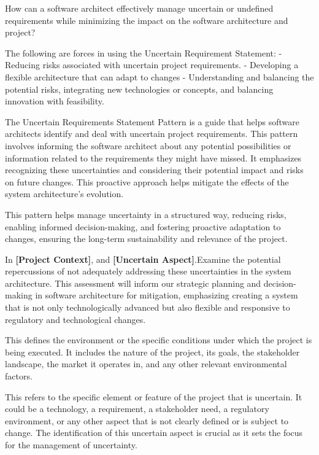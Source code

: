  How can a software architect effectively manage uncertain or undefined requirements while minimizing the impact on the software architecture and project?

 The following are forces in using the Uncertain Requirement Statement: 
\newline
- Reducing risks associated with uncertain project requirements.
\newline
- Developing a flexible architecture that can adapt to changes
\newline
- Understanding and balancing the potential risks, integrating new technologies or concepts, and balancing innovation with feasibility.

 The Uncertain Requirements Statement Pattern is a guide that helps software architects identify and deal with uncertain project requirements. This pattern involves informing the software architect about any potential possibilities or information related to the requirements they might have missed. It emphasizes recognizing these uncertainties and considering their potential impact and risks on future changes. This proactive approach helps mitigate the effects of the system architecture's evolution.

 This pattern helps manage uncertainty in a structured way, reducing risks, enabling informed decision-making, and fostering proactive adaptation to changes, ensuring the long-term sustainability and relevance of the project.

  In \textbf{\textcolor{mycolorgreen}{[Project Context]}}, and \textbf{\textcolor{mycolorblue}{[Uncertain Aspect]}}.Examine the potential repercussions of not adequately addressing these uncertainties in the system architecture. This assessment will inform our strategic planning and decision-making in software architecture for mitigation, emphasizing creating a system that is not only technologically advanced but also flexible and responsive to regulatory and technological changes.

\MyParaBold{\textcolor{mycolorgreen}{[Project Context:]}} This defines the environment or the specific conditions under which the project is being executed. It includes the nature of the project, its goals, the stakeholder landscape, the market it operates in, and any other relevant environmental factors.

\MyParaBold{\textcolor{mycolorblue}{[Uncertain Aspect:]}} This refers to the specific element or feature of the project that is uncertain. It could be a technology, a requirement, a stakeholder need, a regulatory environment, or any other aspect that is not clearly defined or is subject to change. The identification of this uncertain aspect is crucial as it sets the focus for the management of uncertainty.

